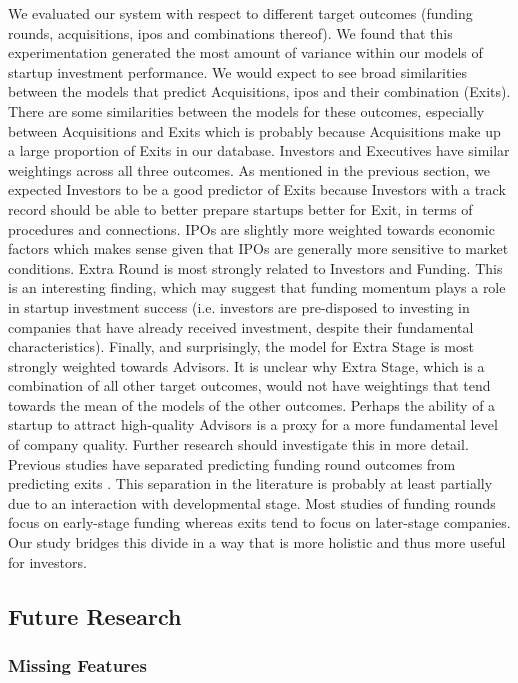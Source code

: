 \documentclass[../thesis/thesis.tex]{subfiles}
\begin{document}
We evaluated our system with respect to different target outcomes (funding rounds, acquisitions, \gls{ipo}s and combinations thereof). We found that this experimentation generated the most amount of variance within our models of startup investment performance. We would expect to see broad similarities between the models that predict Acquisitions, \gls{ipo}s and their combination (Exits). There are some similarities between the models for these outcomes, especially between Acquisitions and Exits which is probably because Acquisitions make up a large proportion of Exits in our database. Investors and Executives have similar weightings across all three outcomes. As mentioned in the previous section, we expected Investors to be a good predictor of Exits because Investors with a track record should be able to better prepare startups better for Exit, in terms of procedures and connections. IPOs are slightly more weighted towards economic factors which makes sense given that IPOs are generally more sensitive to market conditions. Extra Round is most strongly related to Investors and Funding. This is an interesting finding, which may suggest that funding momentum plays a role in startup investment success (i.e. investors are pre-disposed to investing in companies that have already received investment, despite their fundamental characteristics). Finally, and surprisingly, the model for Extra Stage is most strongly weighted towards Advisors. It is unclear why Extra Stage, which is a combination of all other target outcomes, would not have weightings that tend towards the mean of the models of the other outcomes. Perhaps the ability of a startup to attract high-quality Advisors is a proxy for a more fundamental level of company quality. Further research should investigate this in more detail. Previous studies have separated predicting funding round outcomes \cite{beckwith2016,yuan2016,ahlers2015,an2015} from predicting exits \cite{bhat2011}. This separation in the literature is probably at least partially due to an interaction with developmental stage. Most studies of funding rounds focus on early-stage funding whereas exits tend to focus on later-stage companies. Our study bridges this divide in a way that is more holistic and thus more useful for investors.

\subsection{Future Research}

\subsubsection{Missing Features}
\end{document}
